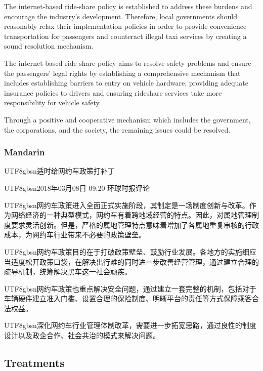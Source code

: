 \documentclass[11pt]{article}
\newcommand{\zh}[1]{\begin{CJK*}{UTF8}{gbsn}#1\end{CJK*}}
\begin{document}
The internet-based ride-share policy is established to address these burdens and encourage the industry’s development. Therefore, local governments should reasonably relax their implementation policies in order to provide convenience transportation for passengers and counteract illegal taxi services by creating a sound resolution mechanism.

The internet-based ride-share policy aims to resolve safety problems and ensure the passengers’ legal rights by establishing a comprehensive mechanism that includes establishing barriers to entry on vehicle hardware, providing adequate insurance policies to drivers and ensuring rideshare services take more responsibility for vehicle safety.

Through a positive and cooperative mechanism which includes the government, the corporations, and the society, the remaining issues could be resolved.

\subsubsection{Mandarin}

\begin{minipage}{\linewidth}

\zh{适时给网约车政策打补丁}\newline

\noindent\zh{2018年03月08日 09:20 环球时报评论}\newline

\zh{网约车政策进入全面正式实施阶段，其制定是一场制度创新与改革。作为网络经济的一种典型模式，网约车有着跨地域经营的特点。因此，对属地管理制度要求灵活创新。但是，严格的属地管理特点意味着增加了各属地重复审核的行政成本，为网约车行业带来不必要的政策壁垒。}

\zh{网约车政策目的在于打破政策壁垒、鼓励行业发展。各地方的实施细应当适度松开政策口袋，在解决出行难的同时进一步改善经营管理，通过建立合理的疏导机制，统筹解决黑车这一社会顽疾。}

\zh{网约车政策也重点解决安全问题，通过建立一套完整的机制，包括对于车辆硬件建立准入门槛、设置合理的保险制度、明晰平台的责任等方式保障乘客合法权益。}

\zh{深化网约车行业管理体制改革，需要进一步拓宽思路，通过良性的制度设计以及政企合作、社会共治的模式来解决问题。}

\end{minipage}

\subsection{Treatments}
\end{document}
